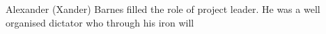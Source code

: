 Alexander (Xander) Barnes filled the role of project leader. He was a well organised dictator who through his iron will 